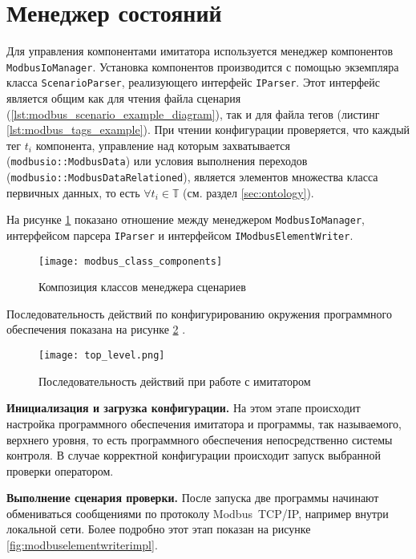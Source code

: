 \section{Менеджер состояний}
Для управления компонентами имитатора используется менеджер компонентов \texttt{ModbusIoManager}.
Установка компонентов производится с помощью экземпляра класса \texttt{ScenarioParser}, реализующего интерфейс \texttt{IParser}.
Этот интерфейс является общим как для чтения файла сценария (\ref{lst:modbus_scenario_example_diagram}),
так и для файла тегов (листинг \ref{lst:modbus_tags_example}).
При чтении конфигурации проверяется, что каждый тег $t_i$ компонента,
управление над которым захватывается (\texttt{modbusio::ModbusData})
или условия выполнения переходов (\texttt{modbusio::ModbusDataRelationed}),
является элементов множества класса первичных данных, то есть $\forall t_i \in \mathbb{T}$ (см. раздел \ref{sec:ontology}).

На рисунке \ref{fig:modbus_class_components} показано отношение между менеджером \texttt{ModbusIoManager},
интерфейсом парсера \texttt{IParser} и интерфейсом \texttt{IModbusElementWriter}.
\begin{center}
    \begin{figure}[hb!]
        \texttt{[image: modbus\_class\_components]}
        \caption{Композиция классов менеджера сценариев}\label{fig:modbus_class_components}
    \end{figure}
\end{center}


Последовательность действий по конфигурированию окружения программного обеспечения
показана на рисунке \ref{fig:top_level_sequence} \cite[стр. 239]{book:oop:oop_analize}.
\begin{center}
    \begin{figure}
        \texttt{[image: top\_level.png]}
        \caption{Последовательность действий при работе с имитатором}
        \label{fig:top_level_sequence}
    \end{figure}
\end{center}

\textbf{Инициализация и загрузка конфигурации.}
На этом этапе происходит настройка программного обеспечения
имитатора и программы, так называемого, верхнего уровня,
то есть программного обеспечения непосредственно системы контроля.
В случае корректной конфигурации происходит запуск
выбранной проверки оператором.

\textbf{Выполнение сценария проверки.}
После запуска две программы начинают обмениваться 
сообщениями по протоколу Modbus~TCP/IP, например внутри локальной сети.
Более подробно этот этап показан на рисунке \ref{fig:modbuselementwriterimpl}.

